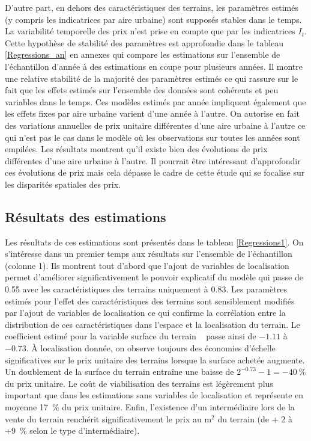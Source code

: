 \documentclass[10.5pt,a4paper]{article}
\begin{document}
{D'autre part, en dehors des caractéristiques des terrains, les paramètres estimés (y compris les indicatrices par aire urbaine) sont supposés stables dans le temps. La variabilité temporelle des prix n'est prise en compte que par les indicatrices $I_t$. Cette hypothèse de stabilité des paramètres est approfondie dans le tableau \ref{Regressions_an} en annexes qui compare les estimations sur l'ensemble de l'échantillon d'année à des estimations en coupe pour plusieurs années. Il montre une relative stabilité de la majorité des paramètres estimés ce qui rassure sur le fait que les effets estimés sur l'ensemble des données sont cohérents et peu variables dans le temps. Ces modèles estimés par année impliquent également que les effets fixes par aire urbaine varient d'une année à l'autre. On autorise en fait des variations annuelles de prix unitaire différentes d'une aire urbaine à l'autre ce qui n'est pas le cas dans le modèle où les observations sur toutes les années sont empilées. Les résultats montrent qu'il existe bien des évolutions de prix différentes d'une aire urbaine à l'autre. Il pourrait être intéressant d'approfondir ces évolutions de prix mais cela dépasse le cadre de cette étude qui se focalise sur les disparités spatiales des prix. \par      

\subsection{Résultats des estimations}





Les résultats de ces estimations sont présentés dans le tableau \ref{Regressions1}. On s'intéresse dans un premier temps aux résultats sur l'ensemble de l'échantillon (colonne 1). Ils montrent tout d'abord que l'ajout de variables de localisation permet d'améliorer significativement le pouvoir explicatif du modèle qui passe de 0.55 avec les caractéristiques des terrains uniquement à 0.83. Les paramètres estimés pour l'effet des caractéristiques des terrains sont sensiblement modifiés par l'ajout de variables de localisation ce qui confirme la corrélation entre la distribution de ces caractéristiques dans l'espace et la localisation du terrain. Le coefficient estimé pour la variable \og surface du terrain \fg~ passe ainsi de $-1.11$ à $-0.73$. \`{A} localisation donnée, on observe toujours des économies d'échelle significatives sur le prix unitaire des terrains lorsque la surface achetée augmente. Un doublement de la surface du terrain entraîne une baisse de $2^{-0.73}-1 = -40~\% $ du prix unitaire.  Le coût de viabilisation des terrains est légèrement plus important que dans les estimations sans variables de localisation et représente en moyenne 17~\% du prix unitaire.  Enfin, l'existence d'un intermédiaire lors de la vente  du terrain renchérit significativement le prix au m$^2$ du terrain (de + 2 à +9~\% selon le type d'intermédiaire). \par  

}
\end{document}

